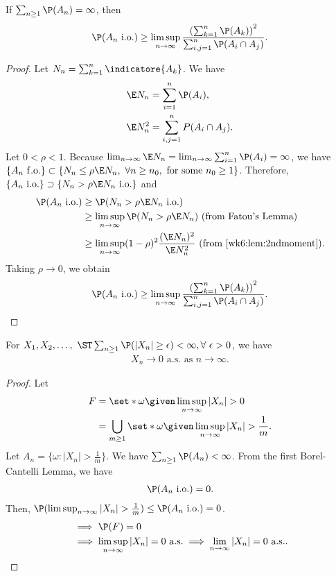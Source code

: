 \documentclass[../aipt.tex]{subfiles}
\begin{document}
\begin{Lemma}
If $\sum_{n \geq 1} \P(A_n) = \infty$, then
\begin{align*}
\P(A_n \io) \geq \limsup_{n \to \infty} \frac{\left(\sum_{k=1}^n\P(A_k)\right)^2}{\sum_{i, j=1}^n \P(A_i \cap A_j)}.
\end{align*}
\end{Lemma}
%
\begin{proof}
Let $N_n = \sum_{k=1}^{n} \indicatore{A_k}$. We have
\begin{align*}
\E N_n 
&= \sum_{i=1}^n \P(A_i), \\
\E N_n^2 
&= \sum_{i,j=1}^n P(A_i \cap A_j).
\end{align*}
Let $0 < \rho < 1$. Because $\lim_{n \to \infty} \E N_n = \lim_{n \to \infty} \sum_{i=1}^n \P(A_i) = \infty$, we have $\{A_n \fo\} \subset \{N_n \leq \rho\E N_n,\ \forall n\geq n_0,\ \text{for some } n_0\geq 1\}$. Therefore, $\{A_n \io\} \supset \{N_n > \rho\E N_n \io\}$ and 
\begin{align*}
\P(A_n \io)
&\geq \P(N_n > \rho \E N_n \io) \\
&\geq \limsup_{n \to \infty}  \P(N_n > \rho \E N_n) \ \text{(from Fatou's Lemma)} \\
&\geq \limsup_{n \to \infty} (1-\rho)^2 \frac{(\E N_n)^2}{\E N_n^2} \ \text{(from \cref{wk6:lem:2ndmoment})}.
\end{align*}
Taking $\rho \to 0$, we obtain
\begin{align*}
\P(A_n \io) \geq \limsup_{n \to \infty} \frac{\left(\sum_{k=1}^n\P(A_k)\right)^2}{\sum_{i, j=1}^n \P(A_i \cap A_j)}.
\end{align*}
\end{proof}
%
\begin{Lemma} \label{wk6:lemma:sum_P_finite_convto_0}
For $X_1, X_2, \ldots,\ \ST \sum_{n \geq 1} \P(|X_n| \geq \epsilon) < \infty, \forall\ \epsilon > 0$, we have 
\begin{align*}
X_n \to 0 \text{ a.s. as } n \to \infty.
\end{align*}
%
\begin{proof}
Let
\begin{align*}
F 
&= \set*{\omega\given \limsup_{n \to \infty}|X_n| > 0} \\
&= \bigcup_{m \geq 1} \set*{\omega\given \limsup_{n \to \infty}|X_n| > \frac{1}{m}}.
\end{align*}
Let $A_n = \{\omega: |X_n| > \frac{1}{m}\}$. We have $\sum_{n \geq 1} \P(A_n) < \infty$. From the first Borel-Cantelli Lemma, we have
\begin{align*}
\P(A_n \io) = 0.
\end{align*}
Then, $\P(\limsup_{n \to \infty}|X_n| > \frac{1}{m}) \leq \P(A_n \io) =0$.
\begin{align*}
&\implies \P(F) = 0 \\
&\implies \limsup_{n \to \infty}|X_n| = 0 \ \text{a.s.}
\implies \lim_{n \to \infty}|X_n| = 0 \ \text{a.s.}.
\end{align*}
\end{proof}
\end{Lemma}
\end{document}

